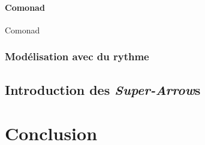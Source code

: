 \documentclass{llncs}
\newcommand{\SAs}{\emph{Super-Arrow}s }
\begin{document}
\begin{lstlisting}[language=haskell]
\end{lstlisting}

\paragraph{Comonad}
Comonad~\cite{Brookes91}~\cite{Coutts07}

\subsubsection{Modélisation avec du rythme}

\subsection{Introduction des \SAs}

\section{Conclusion}

% 

% 



\end{document}
